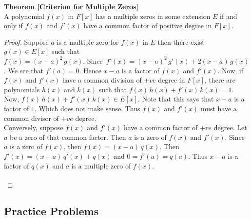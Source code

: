 \documentclass[11pt,a4paper]{article}
\theoremstyle{definition}
\begin{document}
\textbf{Theorem [Criterion for Multiple Zeros]}\\
A polynomial $f(x)$ in $F[x]$ has a multiple zeros in some extension $E$ if and only if $f(x)$ and $f'(x)$ have a common factor of positive degree in $F[x]$.\\


\begin{proof}
Suppose $a$ is a multiple zero for $f(x)$ in $E$ then there exist $g(x)\in E[x]$ such that\\ $f(x) = (x - a)^2\, g(x)$. Since $\, f'(x) = (x - a)^2\, g'(x) + 2(x - a)\, g(x)$. We see that $f'(a) = 0$. Hence $x - a$ is a factor of $f(x)$ and $f'(x)$.
Now, if $f(x)$ and $f'(x)$ have a common division of $+ve$ degree in $F[x]$, there are polynomials $h(x)$ and $k(x)$ such that $f(x) \, h(x) + f'(x)\, k(x) = 1$. Now, $f(x)\, h(x) + f'(x)\, k(x)\in E[x]$. Note that this says that $x-a$ is a factor of $1$. Which does not make sense. Thus $f(x)$ and $f'(x)$ must have a common divisor of $+ve$ degree.\\
Conversely, suppose $f(x)$ and $f'(x)$ have a common factor of $+ve$ degree. Let $a$ be a zero of that common factor. Then $a$ is a zero of $f(x)$ and $f'(x)$. Since $a$ is a zero of $f(x)$, then $f(x) = (x - a)\, q(x)$. Then $f'(x) = (x-a)\, q'(x) + q(x)$ and $0 = f'(a) = q(a)$. Thus $x - a$ is a factor of $q(x)$ and $a$ is a multiple zero of $f(x)$.\\\\
\end{proof}
























\subsection{Practice Problems}
\end{document}
